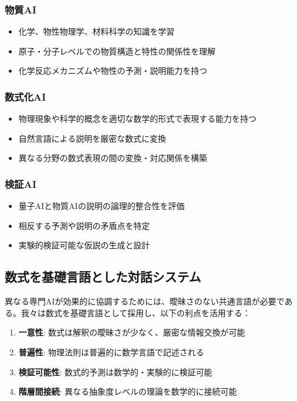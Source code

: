 \documentclass[12pt,a4paper]{article}
\begin{document}
\subsubsection{物質AI}
\begin{itemize}
\item 化学、物性物理学、材料科学の知識を学習
\item 原子・分子レベルでの物質構造と特性の関係性を理解
\item 化学反応メカニズムや物性の予測・説明能力を持つ
\end{itemize}

\subsubsection{数式化AI}
\begin{itemize}
\item 物理現象や科学的概念を適切な数学的形式で表現する能力を持つ
\item 自然言語による説明を厳密な数式に変換
\item 異なる分野の数式表現の間の変換・対応関係を構築
\end{itemize}

\subsubsection{検証AI}
\begin{itemize}
\item 量子AIと物質AIの説明の論理的整合性を評価
\item 相反する予測や説明の矛盾点を特定
\item 実験的検証可能な仮説の生成と設計
\end{itemize}

\subsection{数式を基礎言語とした対話システム}

異なる専門AIが効果的に協調するためには、曖昧さのない共通言語が必要である。我々は数式を基礎言語として採用し、以下の利点を活用する：

\begin{enumerate}
\item \textbf{一意性}: 数式は解釈の曖昧さが少なく、厳密な情報交換が可能
\item \textbf{普遍性}: 物理法則は普遍的に数学言語で記述される
\item \textbf{検証可能性}: 数式的予測は数学的・実験的に検証可能
\item \textbf{階層間接続}: 異なる抽象度レベルの理論を数学的に接続可能
\end{enumerate}
\end{document}
